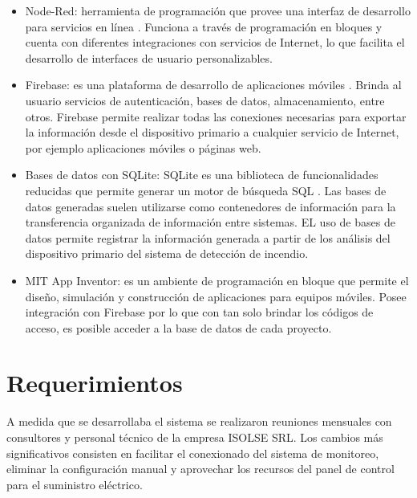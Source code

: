 \begin{itemize}
\item Node-Red: herramienta de programación que provee una interfaz de desarrollo para servicios en línea \cite{node_red}. Funciona a través de programación en bloques y cuenta con diferentes integraciones con servicios de Internet, lo que facilita el desarrollo de interfaces de usuario personalizables.    

\item Firebase: es una plataforma de desarrollo de aplicaciones móviles \cite{firebase}. Brinda al usuario servicios de autenticación, bases de datos, almacenamiento, entre otros. Firebase permite realizar todas las conexiones necesarias para exportar la información desde el dispositivo primario a cualquier servicio de Internet, por ejemplo aplicaciones móviles o páginas web. 

\item Bases de datos con SQLite: SQLite es una biblioteca de funcionalidades reducidas que permite generar un motor de búsqueda SQL \cite{sqlite}. Las bases de datos generadas suelen utilizarse como contenedores de información para la transferencia organizada de información entre sistemas. EL uso de bases de datos permite registrar la información generada a partir de los análisis del dispositivo primario del sistema de detección de incendio.

\item MIT App Inventor: es un ambiente de programación en bloque que permite el diseño, simulación y construcción de aplicaciones para equipos móviles. Posee integración con Firebase por lo que con tan solo brindar los códigos de acceso, es posible acceder a la base de datos de cada proyecto.      
\end{itemize}

\section{Requerimientos}

A medida que se desarrollaba el sistema se realizaron reuniones mensuales con consultores y personal técnico de la empresa ISOLSE SRL. Los cambios más significativos consisten en facilitar el conexionado del sistema de monitoreo, eliminar la configuración manual y aprovechar los recursos del panel de control para el suministro eléctrico.   


